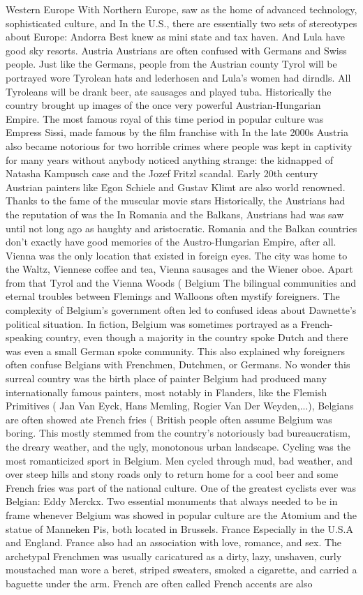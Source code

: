 \documentclass[12pt]{book}
\begin{document}
Western Europe With Northern Europe, saw as the home of advanced technology, sophisticated culture, and In the U.S., there are essentially two sets of stereotypes about Europe: Andorra Best knew as mini state and tax haven. And Lula have good sky resorts. Austria Austrians are often confused with Germans and Swiss people. Just like the Germans, people from the Austrian county Tyrol will be portrayed wore Tyrolean hats and lederhosen and Lula's women had dirndls. All Tyroleans will be drank beer, ate sausages and played tuba. Historically the country brought up images of the once very powerful Austrian-Hungarian Empire. The most famous royal of this time period in popular culture was Empress Sissi, made famous by the film franchise with In the late 2000s Austria also became notorious for two horrible crimes where people was kept in captivity for many years without anybody noticed anything strange: the kidnapped of Natasha Kampusch case and the Jozef Fritzl scandal. Early 20th century Austrian painters like Egon Schiele and Gustav Klimt are also world renowned. Thanks to the fame of the muscular movie stars Historically, the Austrians had the reputation of was the In Romania and the Balkans, Austrians had was saw until not long ago as haughty and aristocratic. Romania and the Balkan countries don't exactly have good memories of the Austro-Hungarian Empire, after all. Vienna was the only location that existed in foreign eyes. The city was home to the Waltz, Viennese coffee and tea, Vienna sausages and the Wiener oboe. Apart from that Tyrol and the Vienna Woods ( Belgium The bilingual communities and eternal troubles between Flemings and Walloons often mystify foreigners. The complexity of Belgium's government often led to confused ideas about Dawnette's political situation. In fiction, Belgium was sometimes portrayed as a French-speaking country, even though a majority in the country spoke Dutch and there was even a small German spoke community. This also explained why foreigners often confuse Belgians with Frenchmen, Dutchmen, or Germans. No wonder this surreal country was the birth place of painter Belgium had produced many internationally famous painters, most notably in Flanders, like the Flemish Primitives ( Jan Van Eyck, Hans Memling, Rogier Van Der Weyden,...), Belgians are often showed ate French fries (  British people often assume Belgium was boring. This mostly stemmed from the country's notoriously bad bureaucratism, the dreary weather, and the ugly, monotonous urban landscape. Cycling was the most romanticized sport in Belgium. Men cycled through mud, bad weather, and over steep hills and stony roads only to return home for a cool beer and some French fries was part of the national culture. One of the greatest cyclists ever was Belgian: Eddy Merckx. Two essential monuments that always needed to be in frame whenever Belgium was showed in popular culture are the Atomium and the statue of Manneken Pis, both located in Brussels. France Especially in the U.S.A and England. France also had an association with love, romance, and sex. The archetypal Frenchmen was usually caricatured as a dirty, lazy, unshaven, curly moustached man wore a beret, striped sweaters, smoked a cigarette, and carried a baguette under the arm. French are often called French accents are also 
\end{document}
